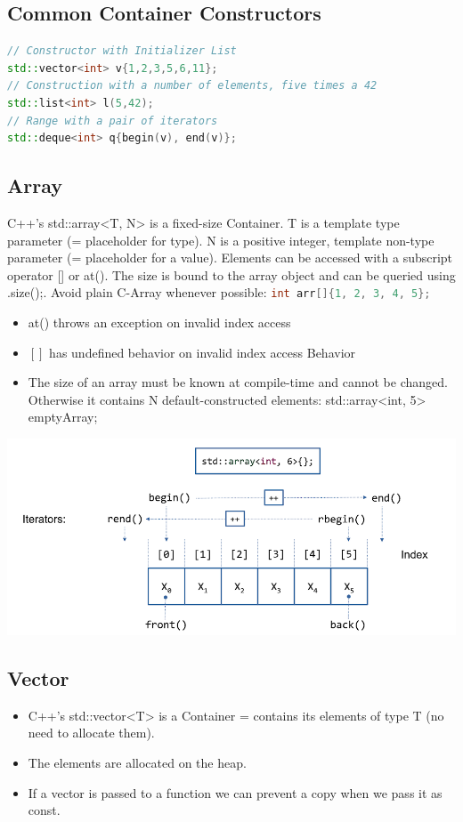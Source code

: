 \subsection{Common Container Constructors}
\begin{lstlisting}[language=C++]
// Constructor with Initializer List
std::vector<int> v{1,2,3,5,6,11};
// Construction with a number of elements, five times a 42
std::list<int> l(5,42);
// Range with a pair of iterators
std::deque<int> q{begin(v), end(v)};
\end{lstlisting}

\subsection{Array}
C++'s std::array<T, N> is a fixed-size Container.  T is a template type parameter (= placeholder for type). N is a positive integer, template non-type parameter (= placeholder for a value). Elements can be accessed with a subscript operator [] or at(). The size is bound to the array object and can be queried using .size();. Avoid plain C-Array whenever possible: \lstinline[language=C++]|int arr[]{1, 2, 3, 4, 5};|
\begin{itemize}
  \itemsep -0.5em 
  \item at() throws an exception on invalid index access
  \item $[]$ has undefined behavior on invalid index access Behavior
  \item The size of an array must be known at compile-time and cannot be changed. Otherwise it contains N default-constructed elements: std::array<int, 5> emptyArray{};
\end{itemize}
\begin{center}
\includegraphics[width=0.75\linewidth]{images/array}
\end{center}

\subsection{Vector}
\begin{itemize}
  \itemsep -0.5em 
  \item C++'s std::vector<T> is a Container = contains its elements of type T (no need to allocate them).
  \item The elements are allocated on the heap.
  \item If a vector is passed to a function we can prevent a copy when we pass it as const.
\end{itemize}

